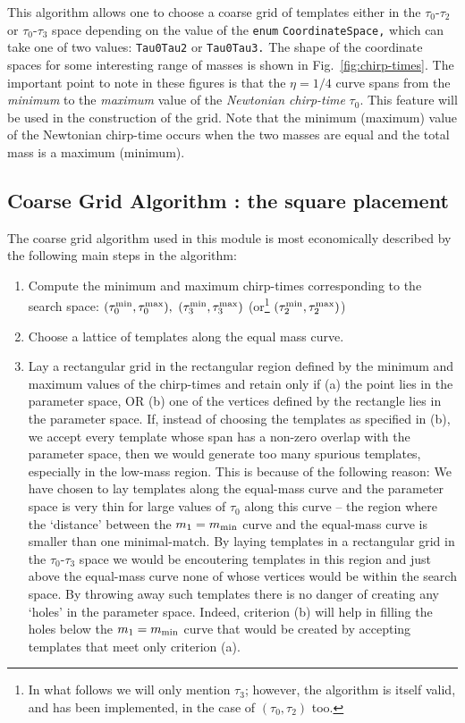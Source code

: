 This algorithm allows one to choose
a coarse grid of templates either in the $\tau_0$-$\tau_2$
or $\tau_0$-$\tau_3$ space depending on the value of the
\texttt {enum} 
\texttt {CoordinateSpace,} which can take one of two values:
\texttt {Tau0Tau2} or \texttt {Tau0Tau3.} The shape of the coordinate
spaces for some interesting range of masses is shown 
in Fig.~\ref{fig:chirp-times}. The important point to note in these
figures is that the $\eta=1/4$ curve spans from the {\it minimum} to the
{\it maximum} value of the {\it Newtonian chirp-time} $\tau_0.$  This
feature will be used in the construction of the grid. Note that
the minimum (maximum) value of the Newtonian chirp-time occurs when 
the two masses are equal and the total mass is a maximum (minimum).

\subsection{Coarse Grid Algorithm : the square placement}

The coarse grid algorithm used in this module is most economically
described by the following main steps in the algorithm:
\begin{enumerate}
\item Compute the minimum and maximum chirp-times corresponding to the
search space: $(\tau_0^{\rm min}, \tau_0^{\rm max}),$
$(\tau_3^{\rm min}, \tau_3^{\rm max})$ (or\footnote{In what follows
we will only mention $\tau_3$; however, the algorithm is itself valid,
and has been implemented, in the case of $(\tau_0,\tau_2)$ too.}
$(\tau_2^{\rm min}, \tau_2^{\rm max})$) 

 \item Choose a lattice of templates along the equal mass curve.

\item Lay a rectangular grid in the rectangular region defined by
the minimum and maximum values of the chirp-times and retain only
if (a) the point lies in the parameter space, OR (b) one of the
vertices defined by the rectangle lies in the parameter space.
If, instead of choosing the templates as specified in (b), we accept 
every template whose span has a non-zero overlap with the parameter 
space, then we
would generate too many spurious templates, especially in the low-mass
region. This is because of the following reason:
We have chosen to lay templates along the
equal-mass curve and the parameter space is very thin for large values
of $\tau_0$ along this curve -- the region where the `distance'
between the $m_1=m_{\rm min}$ curve and the equal-mass curve is
smaller than one minimal-match.
By laying templates in a rectangular grid in the
$\tau_0$-$\tau_3$ space we would be encoutering templates in this
region and just above the equal-mass curve
none of whose vertices would be within the search space. By
throwing away such templates there is no danger of creating any
`holes' in the parameter space. Indeed, criterion (b) 
will help in filling the holes below the $m_1=m_{\rm min}$ 
curve that would be created by accepting templates that meet
only criterion (a).
 
\end{enumerate}

